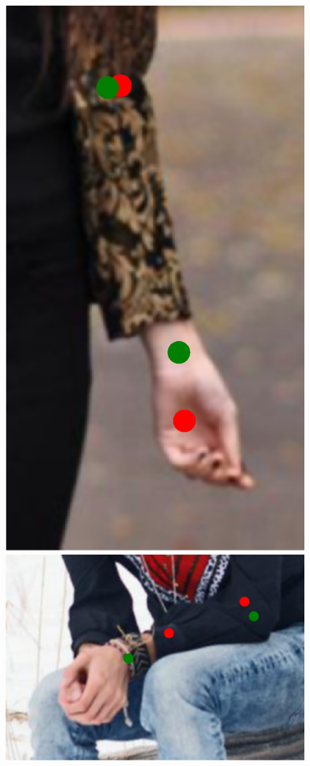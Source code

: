 \begin{figure}[!t]
    \includegraphics[height=\fh]{resources/Fixing/fix_15}
    \hfill
    \includegraphics[height=\fh]{resources/Fixing/fix_17}

\end{figure}
